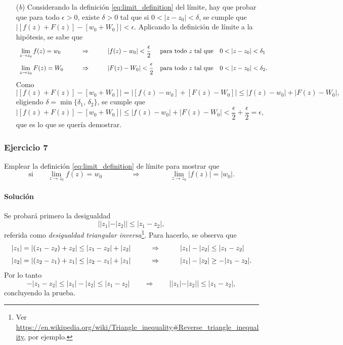 \documentclass[a4paper]{report}
\begin{document}
\begin{enumerate}
 \item[(\textit{b})] Considerando la definición \ref{eq:limit_definition} del límite, hay que probar que para todo \(\epsilon>0\), existe \(\delta>0\) tal que si \(0<|z-z_0|<\delta\), se cumple que \(|[f(z)+F(z)]-[w_0+W_0]|<\epsilon\). Aplicando la definición de límite a la hipótesis, se sabe que
 \[
 \begin{array}{lllll}
  \lim\limits_{z\to z_0}f(z)=w_0 & \qquad\Rightarrow & \qquad|f(z)-w_0|<\dfrac{\epsilon}{2}&\textrm{para todo }z\textrm{ tal que}&0<|z-z_0|<\delta_1\\[\bigskipamount]
  \lim\limits_{z\to z_0}F(z)=W_0 & \qquad\Rightarrow & \qquad|F(z)-W_0|<\dfrac{\epsilon}{2}&\textrm{para todo }z\textrm{ tal que}&0<|z-z_0|<\delta_2.
 \end{array} 
 \]
 Como
 \[
  |[f(z)+F(z)]-[w_0+W_0]|=|[f(z)-w_0]+[F(z)-W_0]|\leq|f(z)-w_0|+|F(z)-W_0|,
 \]
 eligiendo \(\delta=\min\{\delta_1,\,\delta_2\}\), se cumple que 
 \[
  |[f(z)+F(z)]-[w_0+W_0]|\leq|f(z)-w_0|+|F(z)-W_0|<\frac{\epsilon}{2}+\frac{\epsilon}{2}=\epsilon,
 \]
 que es lo que se quería demostrar.
\end{enumerate}

\subsubsection{Ejercicio 7}

Emplear la definición \ref{eq:limit_definition} de límite para mostrar que 
\[
 \textrm{si}\qquad\lim_{z\to z_0}f(z)=w_0
  \qquad\qquad\Rightarrow\qquad\qquad
 \lim_{z\to z_0}|f(z)|=|w_0|.
\]

\paragraph{Solución} Se probará primero la desigualdad 
\begin{equation}\label{eq:reverse_trinagle_inequality}
 ||z_1|-|z_2||\leq|z_1-z_2|,
\end{equation}
referida como \emph{desigualdad triangular inversa}\footnote{Ver \url{https://en.wikipedia.org/wiki/Triangle_inequality\#Reverse_triangle_inequality}, por ejemplo.}. Para hacerlo, se observa que 
\[
 \begin{array}{lll}
  |z_1|=|(z_1-z_2)+z_2|\leq|z_1-z_2|+|z_2| & \qquad\Rightarrow &\qquad |z_1|-|z_2|\leq|z_1-z_2|\\[\medskipamount]
  |z_2|=|(z_2-z_1)+z_1|\leq|z_2-z_1|+|z_1| & \qquad\Rightarrow &\qquad |z_1|-|z_2|\geq-|z_1-z_2|.
 \end{array}
\]
Por lo tanto
\[
 -|z_1-z_2|\leq|z_1|-|z_2|\leq|z_1-z_2|\qquad\Rightarrow\qquad ||z_1|-|z_2||\leq|z_1-z_2|,
\]
concluyendo la prueba.
\end{document}

